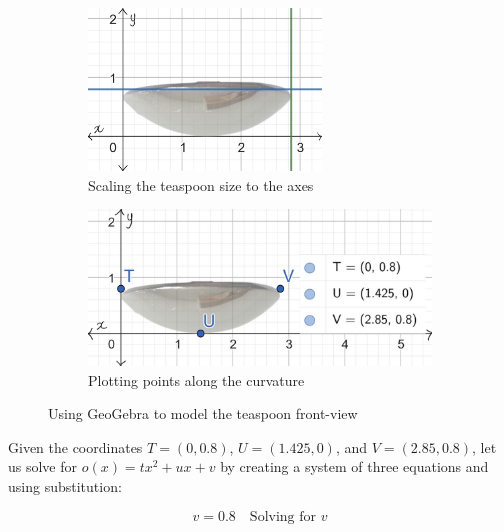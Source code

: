 \documentclass[12pt]{article}
\begin{document}
\begin{figure}[h]
     \centering
     \begin{subfigure}[b]{0.45\textwidth}
         \centering
         \includegraphics[width=0.68\textwidth]{images/tsp scale.jpg}
         \caption{Scaling the teaspoon size to the axes}
         \label{fig:scale}
     \end{subfigure}
     \hfill
     \begin{subfigure}[b]{0.45\textwidth}
         \centering
         \includegraphics[width=\textwidth]{images/tsp points.jpg}
         \caption{Plotting points along the curvature}
         \label{fig:plot}
     \end{subfigure}
     \hfill
        \caption{Using GeoGebra to model the teaspoon front-view}
        \label{fig:tsp geo2}
\end{figure}

\pagebreak

Given the coordinates $T=(0,0.8)$, $U=(1.425,0)$, and $V=(2.85,0.8)$, let us solve for $o(x)=tx^2+ux+v$ by creating a system of three equations and using substitution:

\begin{equation}\label{solve.v}
    \boxed{v = 0.8}  \quad \text{Solving for } v
\end{equation}
\end{document}
